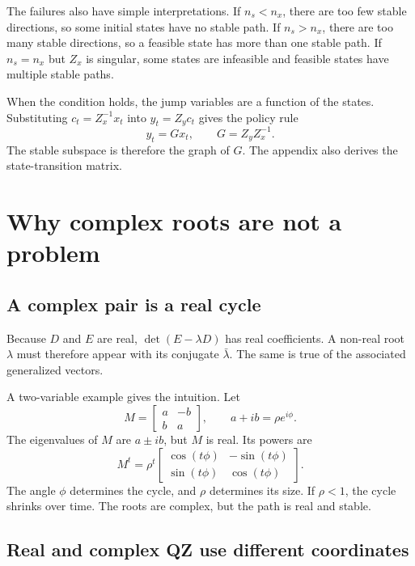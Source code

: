 \documentclass[11pt]{article}
\begin{document}
The failures also have simple interpretations. If $n_s<n_x$, there are too few
stable directions, so some initial states have no stable path. If $n_s>n_x$,
there are too many stable directions, so a feasible state has more than one
stable path. If $n_s=n_x$ but $Z_x$ is singular, some states are infeasible
and feasible states have multiple stable paths.

When the condition holds, the jump variables are a function of the states.
Substituting $c_t=Z_x^{-1}x_t$ into $y_t=Z_yc_t$ gives the policy rule
\begin{equation}
    y_t=Gx_t,
    \qquad
    G=Z_yZ_x^{-1}.
    \label{eq:policy}
\end{equation}
The stable subspace is therefore the graph of $G$. The appendix also derives
the state-transition matrix.

\section{Why complex roots are not a problem}

\subsection{A complex pair is a real cycle}

Because $D$ and $E$ are real, $\det(E-\lambda D)$ has real coefficients. A
non-real root $\lambda$ must therefore appear with its conjugate
$\bar\lambda$. The same is true of the associated generalized vectors.

A two-variable example gives the intuition. Let
\[
    M=\begin{bmatrix}a&-b\\b&a\end{bmatrix},
    \qquad
    a+ib=\rho e^{i\phi}.
\]
The eigenvalues of $M$ are $a\pm ib$, but $M$ is real. Its powers are
\begin{equation}
    M^t
    =\rho^t
    \begin{bmatrix}
        \cos(t\phi)&-\sin(t\phi)\\
        \sin(t\phi)& \cos(t\phi)
    \end{bmatrix}.
    \label{eq:rotation}
\end{equation}
The angle $\phi$ determines the cycle, and $\rho$ determines its size. If
$\rho<1$, the cycle shrinks over time. The roots are complex, but the path is
real and stable.

\subsection{Real and complex QZ use different coordinates}
\end{document}
